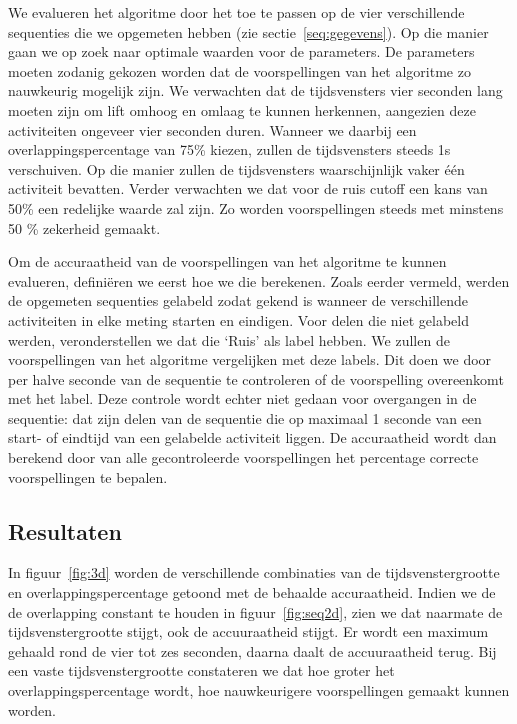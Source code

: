\documentclass{article}
\begin{document}
We evalueren het algoritme door het toe te passen op de vier verschillende sequenties die we opgemeten hebben (zie sectie~\ref{seq:gegevens}). Op die manier gaan we op zoek naar optimale waarden voor de parameters. De parameters moeten zodanig gekozen worden dat de voorspellingen van het algoritme zo nauwkeurig mogelijk zijn. We verwachten dat de tijdsvensters vier seconden lang moeten zijn om lift omhoog en omlaag te kunnen herkennen, aangezien deze activiteiten ongeveer vier seconden duren. Wanneer we daarbij een overlappingspercentage van 75\% kiezen, zullen de tijdsvensters steeds 1s verschuiven. Op die manier zullen de tijdsvensters waarschijnlijk vaker \'e\'en activiteit bevatten. Verder verwachten we dat voor de ruis cutoff een kans van 50\% een redelijke waarde zal zijn. Zo worden voorspellingen steeds met minstens 50 \% zekerheid gemaakt. 

Om de accuraatheid van de voorspellingen van het algoritme te kunnen evalueren, defini\"eren we eerst hoe we die berekenen. Zoals eerder vermeld, werden de opgemeten sequenties gelabeld zodat gekend is wanneer de verschillende activiteiten in elke meting starten en eindigen. Voor delen die niet gelabeld werden, veronderstellen we dat die `Ruis' als label hebben. We zullen de voorspellingen van het algoritme vergelijken met deze labels. Dit doen we door per halve seconde van de sequentie te controleren of de voorspelling overeenkomt met het label. Deze controle wordt echter niet gedaan voor overgangen in de sequentie: dat zijn delen van de sequentie die op maximaal 1 seconde van een start- of eindtijd van een gelabelde activiteit liggen. De accuraatheid wordt dan berekend door van alle gecontroleerde voorspellingen het percentage correcte voorspellingen te bepalen.

\subsection{Resultaten}

In figuur~\ref{fig:3d} worden de verschillende combinaties van de tijdsvenstergrootte en overlappingspercentage getoond met de behaalde accuraatheid. Indien we de de overlapping constant te houden in figuur~\ref{fig:seq2d}, zien we dat naarmate de tijdsvenstergrootte stijgt, ook de accuuraatheid stijgt. Er wordt een maximum gehaald rond de vier tot zes seconden, daarna daalt de accuuraatheid terug. Bij een vaste tijdsvenstergrootte constateren we dat hoe groter het overlappingspercentage wordt, hoe nauwkeurigere voorspellingen gemaakt kunnen worden.
\end{document}
